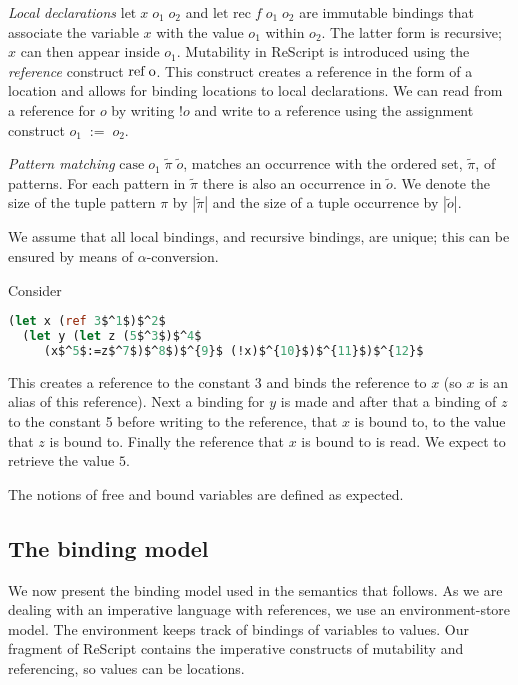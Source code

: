 \documentclass[acmsmall,sigplan]{acmart}
\begin{document}
\emph{Local declarations} $\mbox{let} \; x \; o_1 \; o_2$ and
$\mbox{let rec} \; f \; o_1 \; o_2$ are immutable bindings that
associate the variable $x$ with the value $o_1$ within $o_2$. The latter
form is recursive; $x$ can then appear inside $o_1$. Mutability
in ReScript is introduced using the \emph{reference} construct
$\mbox{ref\;o}$. This construct creates a reference in the form of a
location and allows for binding locations to local declarations. We
can read from a reference for $o$ by writing $!o$ and write to a
reference using the assignment construct $o_1\;:=\;o_2$. 

\emph{Pattern matching} $\mbox{case} \; o_1 \; \tilde{\pi} \; \tilde{o}$, matches an
occurrence with the ordered set, $\tilde{\pi}$, of patterns. For each
pattern in $\tilde{\pi}$ there is also an occurrence in $\tilde{o}$.
We denote the size of the tuple pattern $\pi$ by $|\tilde{\pi}|$ and
the size of a tuple occurrence by $|\tilde{o}|$.

We assume that all local bindings, and recursive bindings, are unique;
this can be ensured by means of $\alpha$-conversion.

\begin{example}[]\label{ex:write}
Consider
\begin{lstlisting}[language=Caml, mathescape=true]
  (let x (ref 3$^1$)$^2$
  (let y (let z (5$^3$)$^4$
     (x$^5$:=z$^7$)$^8$)$^{9}$ (!x)$^{10}$)$^{11}$)$^{12}$
\end{lstlisting}
This creates a reference to the constant 3 and binds the reference to
$x$ (so $x$ is an alias of this reference). Next a binding for $y$ is
made and after that a binding of $z$ to the constant 5 before writing
to the reference, that $x$ is bound to, to the value that $z$ is bound
to.  Finally the reference that $x$ is bound to is read. We expect to
retrieve the value $5$.
\end{example}

The notions of free and bound variables are defined as expected.

\subsection{The binding model}\label{sec:EnvSto}

We now present the binding model used in the semantics that
follows. As we are dealing with an imperative language with
references, we use an environment-store model. The environment keeps
track of bindings of variables to values. Our fragment of ReScript
contains the imperative constructs of mutability and referencing, so
values can be locations.
\end{document}
